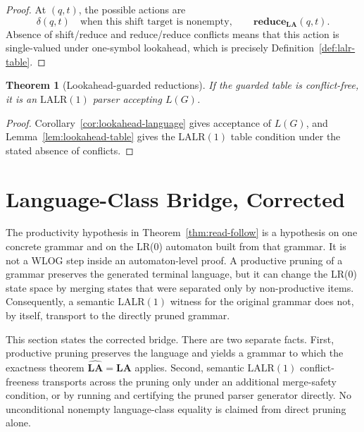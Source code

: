 \documentclass[11pt,a4paper]{article}
\theoremstyle{prettyplain}
\newtheorem{theorem}{Theorem}
\theoremstyle{prettydef}
\newcommand{\LALRone}{\mathrm{LALR(1)}}
\newcommand{\Look}{\mathbf{LA}}
\newcommand{\Reduce}{\mathbf{reduce}}
\begin{document}
\begin{proof}
At \((q,t)\), the possible actions are
\[
\delta(q,t)\quad\text{when this shift target is nonempty},
\qquad
\Reduce_{\Look}(q,t).
\]
Absence of shift/reduce and reduce/reduce conflicts means that this action is
single-valued under one-symbol lookahead, which is precisely Definition~\ref{def:lalr-table}.
\end{proof}

\begin{theorem}[Lookahead-guarded reductions]\label{thm:lookahead-guard}
If the guarded table is conflict-free, it is an \(\LALRone\) parser accepting
\(L(G)\).
\end{theorem}

\begin{proof}
Corollary~\ref{cor:lookahead-language} gives acceptance of \(L(G)\), and
Lemma~\ref{lem:lookahead-table} gives the \(\LALRone\) table condition under the
stated absence of conflicts.
\end{proof}


\section{Language-Class Bridge, Corrected}
\label{sec:language-class-bridge}

The productivity hypothesis in Theorem~\ref{thm:read-follow} is a hypothesis on
one concrete grammar and on the LR(0) automaton built from that grammar.  It is
not a WLOG step inside an automaton-level proof.  A productive pruning of a
grammar preserves the generated terminal language, but it can change the LR(0)
state space by merging states that were separated only by non-productive items.
Consequently, a semantic \(\LALRone\) witness for the original grammar does not,
by itself, transport to the directly pruned grammar.

This section states the corrected bridge.  There are two separate facts.
First, productive pruning preserves the language and yields a grammar to which
the exactness theorem \(\widehat{\Look}=\Look\) applies.  Second, semantic
\(\LALRone\) conflict-freeness transports across the pruning only under an
additional merge-safety condition, or by running and certifying the pruned parser
generator directly.  No unconditional nonempty language-class equality is claimed
from direct pruning alone.
\end{document}
